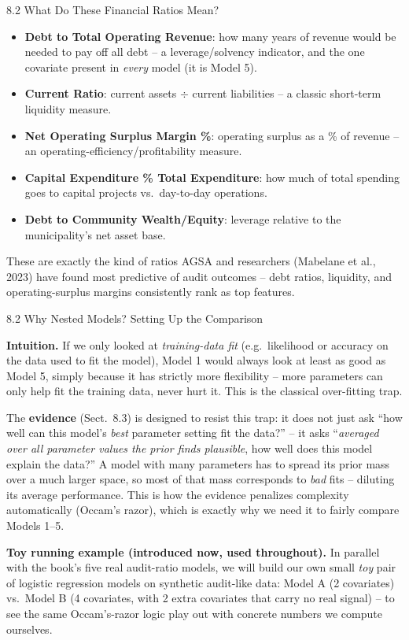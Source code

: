 \documentclass[aspectratio=169,10pt]{beamer}
\begin{document}
\begin{frame}{8.2 What Do These Financial Ratios Mean?}
\begin{itemize}
  \item \textbf{Debt to Total Operating Revenue}: how many years of revenue would be needed to pay off all debt -- a leverage/solvency indicator, and the one covariate present in \emph{every} model (it is Model 5).
  \item \textbf{Current Ratio}: current assets $\div$ current liabilities -- a classic short-term liquidity measure.
  \item \textbf{Net Operating Surplus Margin \%}: operating surplus as a \% of revenue -- an operating-efficiency/profitability measure.
  \item \textbf{Capital Expenditure \% Total Expenditure}: how much of total spending goes to capital projects vs.\ day-to-day operations.
  \item \textbf{Debt to Community Wealth/Equity}: leverage relative to the municipality's net asset base.
\end{itemize}
\vspace{0.2cm}
These are exactly the kind of ratios AGSA and researchers (Mabelane et al., 2023) have found most predictive of audit outcomes -- debt ratios, liquidity, and operating-surplus margins consistently rank as top features.
\end{frame}

\begin{frame}[allowframebreaks]{8.2 Why Nested Models? Setting Up the Comparison}

\textbf{Intuition.} If we only looked at \emph{training-data fit} (e.g.\ likelihood or accuracy on the data used to fit the model), Model 1 would always look at least as good as Model 5, simply because it has strictly more flexibility -- more parameters can only help fit the training data, never hurt it. This is the classical over-fitting trap.

The \textbf{evidence} (Sect.\ 8.3) is designed to resist this trap: it does not just ask ``how well can this model's \emph{best} parameter setting fit the data?'' -- it asks ``\emph{averaged over all parameter values the prior finds plausible}, how well does this model explain the data?'' A model with many parameters has to spread its prior mass over a much larger space, so most of that mass corresponds to \emph{bad} fits -- diluting its average performance. This is how the evidence penalizes complexity automatically (Occam's razor), which is exactly why we need it to fairly compare Models 1--5.

\vspace{0.2cm}
\textbf{Toy running example (introduced now, used throughout).} In parallel with the book's five real audit-ratio models, we will build our own small \emph{toy} pair of logistic regression models on synthetic audit-like data: Model A (2 covariates) vs.\ Model B (4 covariates, with 2 extra covariates that carry no real signal) -- to see the same Occam's-razor logic play out with concrete numbers we compute ourselves.

\end{frame}
\end{document}
